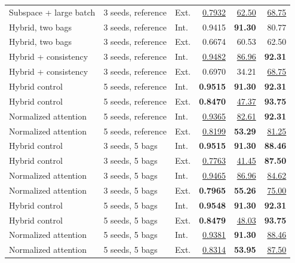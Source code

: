 \begin{longtable}{@{}p{}p{}lrrr@{}}
Subspace + large batch & 3 seeds, reference & Ext. & \underline{0.7932} & \underline{62.50} & \underline{68.75} \\
Hybrid, two bags & 3 seeds, reference & Int. & 0.9415 & \textbf{91.30} & 80.77 \\
Hybrid, two bags & 3 seeds, reference & Ext. & 0.6674 & 60.53 & 62.50 \\
Hybrid + consistency & 3 seeds, reference & Int. & \underline{0.9482} & \underline{86.96} & \textbf{92.31} \\
Hybrid + consistency & 3 seeds, reference & Ext. & 0.6970 & 34.21 & \underline{68.75} \\
Hybrid control & 5 seeds, reference & Int. & \textbf{0.9515} & \textbf{91.30} & \textbf{92.31} \\
Hybrid control & 5 seeds, reference & Ext. & \textbf{0.8470} & \underline{47.37} & \textbf{93.75} \\
Normalized attention & 5 seeds, reference & Int. & \underline{0.9365} & \underline{82.61} & \textbf{92.31} \\
Normalized attention & 5 seeds, reference & Ext. & \underline{0.8199} & \textbf{53.29} & \underline{81.25} \\
Hybrid control & 3 seeds, 5 bags & Int. & \textbf{0.9515} & \textbf{91.30} & \textbf{88.46} \\
Hybrid control & 3 seeds, 5 bags & Ext. & \underline{0.7763} & \underline{41.45} & \textbf{87.50} \\
Normalized attention & 3 seeds, 5 bags & Int. & \underline{0.9465} & \underline{86.96} & \underline{84.62} \\
Normalized attention & 3 seeds, 5 bags & Ext. & \textbf{0.7965} & \textbf{55.26} & \underline{75.00} \\
Hybrid control & 5 seeds, 5 bags & Int. & \textbf{0.9548} & \textbf{91.30} & \textbf{92.31} \\
Hybrid control & 5 seeds, 5 bags & Ext. & \textbf{0.8479} & \underline{48.03} & \textbf{93.75} \\
Normalized attention & 5 seeds, 5 bags & Int. & \underline{0.9381} & \textbf{91.30} & \underline{88.46} \\
Normalized attention & 5 seeds, 5 bags & Ext. & \underline{0.8314} & \textbf{53.95} & \underline{87.50} \\
\end{longtable}
